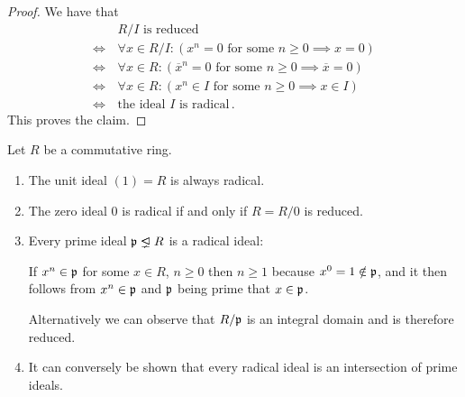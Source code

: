\begin{proof}
  We have that
  \begin{align*}
        &\, \text{$R/I$ is reduced} \\
    \iff&\, \forall x \in R/I : (\text{$x^n = 0$ for some $n \geq 0$} \implies x = 0) \\
    \iff&\, \forall x \in R   : (\text{$\overline{x}^n = 0$ for some $n \geq 0$} \implies \overline{x} = 0) \\
    \iff&\, \forall x \in R   : (\text{$x^n \in I$ for some $n \geq 0$} \implies x \in I) \\
    \iff&\, \text{the ideal $I$ is radical} \,.
  \end{align*}
  This proves the claim.
\end{proof}


\begin{example}
  Let $R$ be a commutative ring.
  \begin{enumerate}
    \item
      The unit ideal $(1) = R$ is always radical.
    \item
      The zero ideal $0$ is radical if and only if $R = R/0$ is reduced.
    \item
      Every prime ideal $\mf{p} \idealneq R$ is a radical ideal:
      
      If $x^n \in \mathfrak{p}$ for some $x \in R$, $n \geq 0$ then $n \geq 1$ because $x^0 = 1 \notin \mathfrak{p}$, and it then follows from $x^n \in \mathfrak{p}$ and $\mathfrak{p}$ being prime that $x \in \mathfrak{p}$.
      
      Alternatively we can observe that $R/\mathfrak{p}$ is an integral domain and is therefore reduced.
    \item
      It can conversely be shown that every radical ideal is an intersection of prime ideals.
  \end{enumerate}
\end{example}


